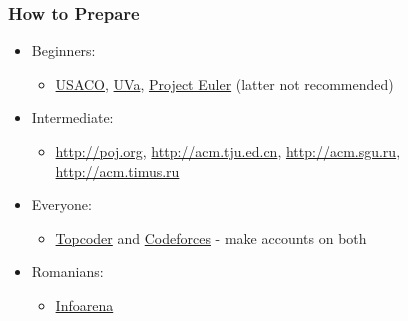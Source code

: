 \documentclass{beamer}
\begin{document}
\begin{frame}
    \frametitle{How to Prepare}
    \begin{itemize}
            \pause
        \item Beginners:
            \begin{itemize}
                    \pause
                \item \href{http://train.usaco.org/usacogate}{USACO}, \href{http://uva.onlinejudge.org/}{UVa}, \href{http://projecteuler.com}{Project Euler} (latter not recommended)
            \end{itemize}
            \pause
        \item Intermediate:
            \begin{itemize}
                    \pause
                \item \url{http://poj.org}, \url{http://acm.tju.ed.cn}, \url{http://acm.sgu.ru}, \url{http://acm.timus.ru} 
            \end{itemize}
            \pause
        \item Everyone:
            \begin{itemize}
                    \pause
                \item \href{http://topcoder.com/tc}{Topcoder} and \href{http://codeforces.com}{Codeforces} - make accounts on both
            \end{itemize}
            \pause
        \item Romanians:
            \begin{itemize}
                    \pause
                \item \href{http://infoarena.ro}{Infoarena}
            \end{itemize}
    \end{itemize}
\end{frame}
\end{document}
